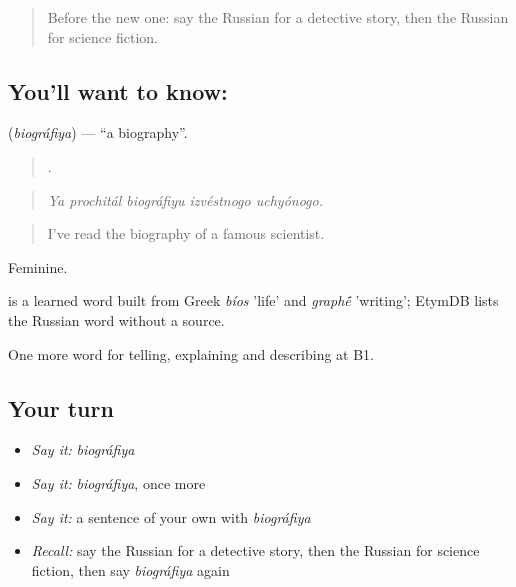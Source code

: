 \label{lesson:RU-C524-biografiya}



\begin{quote}
Before the new one: say the Russian for a detective story, then the Russian for science fiction.
\end{quote}

\subsection*{You'll want to know: }
\textbf{} (\emph{biográfiya}) — \textquotedblleft{}a biography\textquotedblright{}.

\begin{quote}
    .
\end{quote}

\begin{quote}
\emph{Ya prochitál biográfiyu izvéstnogo uchyónogo.}
\end{quote}

\begin{quote}
I've read the biography of a famous scientist.
\end{quote}

Feminine.

\begin{cousinweb}
\emph{} is a learned word built from Greek \emph{bíos} 'life' and \emph{graph\'{\={e}}} 'writing'; EtymDB lists the Russian word without a source.
\end{cousinweb}

\begin{grammarlens}[title={What you've built}]
One more word for telling, explaining and describing at B1.
\end{grammarlens}

\subsection*{Your turn}
\begin{itemize}
\raggedright
  \item \emph{Say it:} \emph{biográfiya}
  \item \emph{Say it:} \emph{biográfiya}, once more
  \item \emph{Say it:} a sentence of your own with \emph{biográfiya}
  \item \emph{Recall:} say the Russian for a detective story, then the Russian for science fiction, then say \emph{biográfiya} again
\end{itemize}

